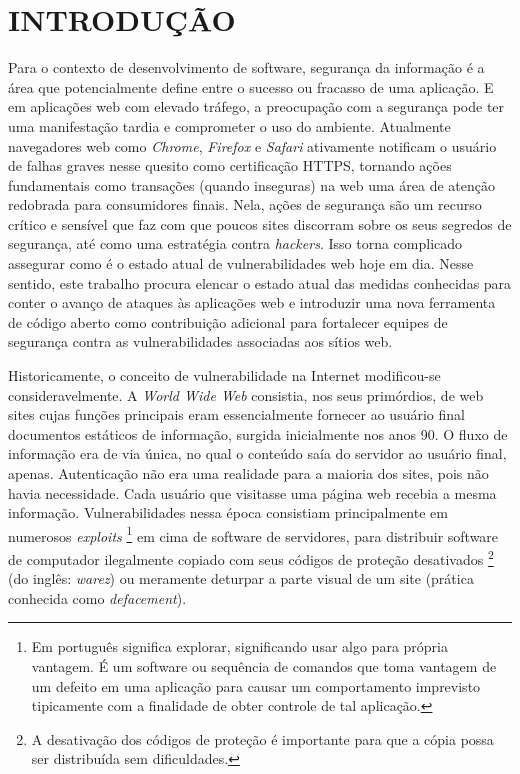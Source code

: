 \chapter{INTRODUÇÃO}

Para o contexto de desenvolvimento de software, segurança da informação é a área que potencialmente define entre o sucesso ou fracasso de uma aplicação. E em aplicações web com elevado tráfego, a preocupação com a segurança pode ter uma manifestação tardia e comprometer o uso do ambiente. Atualmente navegadores web como \textit{Chrome}, \textit{Firefox} e \textit{Safari} ativamente notificam o usuário de falhas graves nesse quesito como certificação HTTPS, tornando ações fundamentais como transações (quando inseguras) na web uma área de atenção redobrada para consumidores finais. Nela, ações de segurança são um recurso crítico e sensível que faz com que poucos sites discorram sobre os seus segredos de segurança, até como uma estratégia contra \textit{hackers}. Isso torna complicado assegurar como é o estado atual de vulnerabilidades web hoje em dia. Nesse sentido, este trabalho procura elencar o estado atual das medidas conhecidas para conter o avanço de ataques às aplicações web e introduzir uma nova ferramenta de código aberto como contribuição adicional para fortalecer equipes de segurança contra as vulnerabilidades associadas aos sítios web. 

Historicamente, o conceito de vulnerabilidade na Internet modificou-se consideravelmente. A \textit{World Wide Web} consistia, nos seus primórdios, de web sites cujas funções principais eram essencialmente fornecer ao usuário final documentos estáticos de informação, surgida inicialmente nos anos 90. O fluxo de informação era de via única, no qual o conteúdo saía do servidor ao usuário final, apenas. Autenticação não era uma realidade para a maioria dos sites, pois não havia necessidade. Cada usuário que visitasse uma página web recebia a mesma informação. \cite{stuttard_web_nodate} Vulnerabilidades nessa época consistiam principalmente em numerosos \textit{exploits} \footnote{Em português significa explorar, significando usar algo para própria vantagem. É um software ou sequência de comandos que toma vantagem de um defeito em uma aplicação para causar um comportamento imprevisto tipicamente com a finalidade de obter controle de tal aplicação. } em cima de software de servidores, para distribuir software de computador ilegalmente copiado com seus códigos de proteção desativados \footnote{A desativação dos códigos de proteção é importante para que a cópia possa ser distribuída sem dificuldades.} (do inglês: \textit{warez}) ou meramente deturpar a parte visual de um site (prática conhecida como \textit{defacement}).


